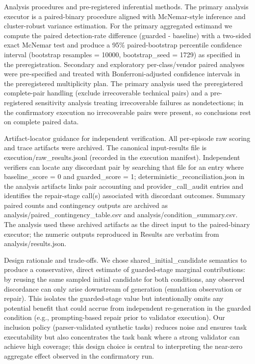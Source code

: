 \documentclass[conference]{IEEEtran}
\begin{document}
Analysis procedures and pre-registered inferential methods. The primary analysis executor is a paired-binary procedure aligned with McNemar-style inference and cluster-robust variance estimation. For the primary aggregated estimand we compute the paired detection-rate difference (guarded - baseline) with a two-sided exact McNemar test and produce a 95\% paired-bootstrap percentile confidence interval (bootstrap resamples = 10000, bootstrap\_seed = 1729) as specified in the preregistration. Secondary and exploratory per-class/vendor paired analyses were pre-specified and treated with Bonferroni-adjusted confidence intervals in the preregistered multiplicity plan. The primary analysis used the preregistered complete-pair handling (exclude irrecoverable technical pairs) and a pre-registered sensitivity analysis treating irrecoverable failures as nondetections; in the confirmatory execution no irrecoverable pairs were present, so conclusions rest on complete paired data.

Artifact-locator guidance for independent verification. All per-episode raw scoring and trace artifacts were archived. The canonical input-results file is execution/raw\_results.jsonl (recorded in the execution manifest). Independent verifiers can locate any discordant pair by searching that file for an entry where baseline\_score = 0 and guarded\_score = 1; deterministic\_reconciliation.json in the analysis artifacts links pair accounting and provider\_call\_audit entries and identifies the repair-stage call(s) associated with discordant outcomes. Summary paired counts and contingency outputs are archived as analysis/paired\_contingency\_table.csv and analysis/condition\_summary.csv. The analysis used these archived artifacts as the direct input to the paired-binary executor; the numeric outputs reproduced in Results are verbatim from analysis/results.json.

Design rationale and trade-offs. We chose shared\_initial\_candidate semantics to produce a conservative, direct estimate of guarded-stage marginal contributions: by reusing the same sampled initial candidate for both conditions, any observed discordance can only arise downstream of generation (emulation observation or repair). This isolates the guarded-stage value but intentionally omits any potential benefit that could accrue from independent re-generation in the guarded condition (e.g., prompting-based repair prior to validator execution). Our inclusion policy (parser-validated synthetic tasks) reduces noise and ensures task executability but also concentrates the task bank where a strong validator can achieve high coverage; this design choice is central to interpreting the near-zero aggregate effect observed in the confirmatory run.
\end{document}
